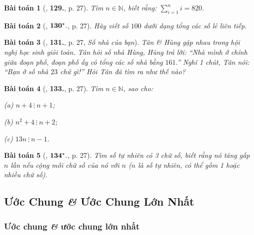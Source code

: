 \documentclass{article}
\numberwithin{equation}{section}
\newtheorem{baitoan}{Bài toán}[section]
\begin{document}
\begin{baitoan}[\cite{Binh_Toan_6_tap_1}, \textbf{129.}, p. 27]
	Tìm $n\in\mathbb{N}$, biết rằng: $\sum_{i=1}^n i = 820$.
\end{baitoan}

\begin{baitoan}[\cite{Binh_Toan_6_tap_1}, $\bf 130^\star.$, p. 27]
	Hãy viết số $100$ dưới dạng tổng các số lẻ liên tiếp.
\end{baitoan}

\begin{baitoan}[\cite{Binh_Toan_6_tap_1}, \textbf{131.}, p. 27, \textit{Số nhà của bạn}]
	Tân \& Hùng gặp nhau trong hội nghị học sinh giỏi toán. Tân hỏi số nhà Hùng, Hùng trả lời: ``Nhà mình ở chính giữa đoạn phố, đoạn phố ấy có tổng các số nhà bằng $161$.'' Nghĩ 1 chút, Tân nói: ``Bạn ở số nhà $23$ chứ gì!'' Hỏi Tân đã tìm ra như thế nào?
\end{baitoan}

\begin{baitoan}[\cite{Binh_Toan_6_tap_1}, \textbf{133.}, p. 27]
	Tìm $n\in\mathbb{N}$, sao cho:
	\begin{enumerate*}
		\item[(a)] $n + 4\ \vdots\ n + 1$;
		\item[(b)] $n^2 + 4\ \vdots\ n + 2$;
		\item[(c)] $13n\ \vdots\ n - 1$.
	\end{enumerate*}
\end{baitoan}

\begin{baitoan}[\cite{Binh_Toan_6_tap_1}, $\bf 134^\star.$, p. 27]
	Tìm số tự nhiên có 3 chữ số, biết rằng nó tăng gấp $n$ lần nếu cộng mỗi chữ số của nó với $n$ ($n$ là số tự nhiên, có thể gồm 1 hoặc nhiều chữ số).
\end{baitoan}


\subsection{Ước Chung \textit{\&} Ước Chung Lớn Nhất}

\subsubsection{Ước chung \textit{\&} ước chung lớn nhất}
\end{document}
